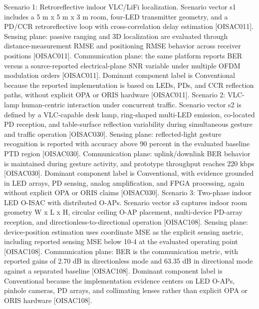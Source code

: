 {}
\markdownRendererSectionEnd \markdownRendererSectionBegin
{}\markdownRendererInterblockSeparator
{}Scenario 1: Retroreflective indoor VLC/LiFi localization.\markdownRendererHardLineBreak
{}Scenario vector s1 includes a 5 m x 5 m x 3 m room, four-LED transmitter geometry, and a PD/CCR retroreflective loop with cross-correlation delay estimation [O\markdownRendererUnderscore{}ISAC\markdownRendererUnderscore{}011]. Sensing plane: passive ranging and 3D localization are evaluated through distance-measurement RMSE and positioning RMSE behavior across receiver positions [O\markdownRendererUnderscore{}ISAC\markdownRendererUnderscore{}011]. Communication plane: the same platform reports BER versus a source-reported electrical-plane SNR variable under multiple OFDM modulation orders [O\markdownRendererUnderscore{}ISAC\markdownRendererUnderscore{}011]. Dominant component label is Conventional because the reported implementation is based on LEDs, PDs, and CCR reflection paths, without explicit OPA or ORIS hardware [O\markdownRendererUnderscore{}ISAC\markdownRendererUnderscore{}011].\markdownRendererParagraphSeparator
{}Scenario 2: VLC-lamp human-centric interaction under concurrent traffic.\markdownRendererHardLineBreak
{}Scenario vector s2 is defined by a VLC-capable desk lamp, ring-shaped multi-LED emission, co-located PD reception, and table-surface reflection variability during simultaneous gesture and traffic operation [O\markdownRendererUnderscore{}ISAC\markdownRendererUnderscore{}030]. Sensing plane: reflected-light gesture recognition is reported with accuracy above 90 percent in the evaluated baseline PTD region [O\markdownRendererUnderscore{}ISAC\markdownRendererUnderscore{}030]. Communication plane: uplink/downlink BER behavior is maintained during gesture activity, and prototype throughput reaches 220 kbps [O\markdownRendererUnderscore{}ISAC\markdownRendererUnderscore{}030]. Dominant component label is Conventional, with evidence grounded in LED arrays, PD sensing, analog amplification, and FPGA processing, again without explicit OPA or ORIS claims [O\markdownRendererUnderscore{}ISAC\markdownRendererUnderscore{}030].\markdownRendererParagraphSeparator
{}Scenario 3: Two-phase indoor LED O-ISAC with distributed O-APs.\markdownRendererHardLineBreak
{}Scenario vector s3 captures indoor room geometry W x L x H, circular ceiling O-AP placement, multi-device PD-array reception, and directionless-to-directional operation [O\markdownRendererUnderscore{}ISAC\markdownRendererUnderscore{}108]. Sensing plane: device-position estimation uses coordinate MSE as the explicit sensing metric, including reported sensing MSE below 10\markdownRendererCircumflex{}-4 at the evaluated operating point [O\markdownRendererUnderscore{}ISAC\markdownRendererUnderscore{}108]. Communication plane: BER is the communication metric, with reported gains of 2.70 dB in directionless mode and 63.35 dB in directional mode against a separated baseline [O\markdownRendererUnderscore{}ISAC\markdownRendererUnderscore{}108]. Dominant component label is Conventional because the implementation evidence centers on LED O-APs, pinhole cameras, PD arrays, and collimating lenses rather than explicit OPA or ORIS hardware [O\markdownRendererUnderscore{}ISAC\markdownRendererUnderscore{}108].\markdownRendererParagraphSeparator
